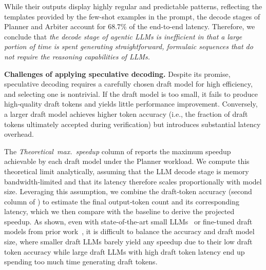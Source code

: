 While their outputs display highly regular and predictable patterns, reflecting the templates provided by the few-shot examples in the prompt, the decode stages of Planner and Arbiter account for 68.7\% of the end-to-end latency. Therefore, we conclude that \textit{the decode stage of agentic LLMs is inefficient in that a large portion of time is spent generating straightforward, formulaic sequences that do not require the reasoning capabilities of LLMs.}


{\bf Challenges of applying speculative decoding.} Despite its promise, speculative decoding requires a carefully chosen draft model for high efficiency, and selecting one is nontrivial. If the draft model is too small, it fails to produce high‑quality draft tokens and yields little performance improvement. Conversely, a larger draft model achieves higher token accuracy (i.e., the fraction of draft tokens ultimately accepted during verification) but introduces substantial latency overhead.

The \textit{Theoretical~max.~speedup} column of  reports the maximum speedup achievable by each draft model under the Planner workload. We compute this theoretical limit analytically, assuming that the LLM decode stage is memory bandwidth‑limited and that its latency therefore scales proportionally with model size. Leveraging this assumption, we combine the draft‑token accuracy (second column of ) to estimate the final output‑token count and its corresponding latency, which we then compare with the baseline to derive the projected speedup. As shown, even with state-of-the-art small LLMs~\cite{llama_3.2} or fine-tuned draft models from prior work~\cite{specinfer}, it is difficult to balance the accuracy and draft model size, where smaller draft LLMs barely yield any speedup due to their low draft token accuracy while large draft LLMs with high draft token latency end up spending too much time generating draft tokens.


\begin{table}[t]
\centering
\caption{
Draft token accuracy and achievable theoretical speedups of various draft models.
}
\footnotesize
{}
\label{tab:draft_specdec_accuracy}
\end{table}


